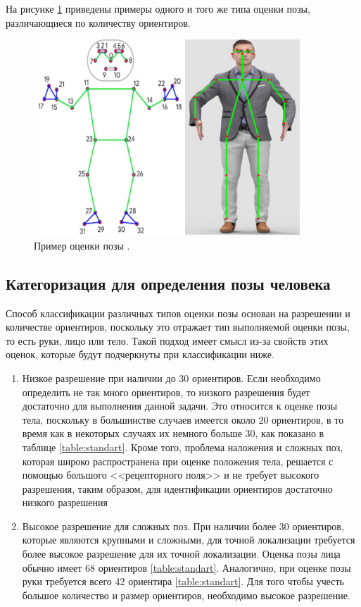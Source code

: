 На рисунке \ref{img:std} приведены примеры одного и того же типа оценки позы, различающиеся по количеству ориентиров.

\begin{figure}[ht!]
	\centering
	\includegraphics[width=0.6\linewidth]{assets/img-std.png}
	\caption{Пример оценки позы \cite{ImageRealtime}.}
	\label{img:std}
\end{figure}

\subsection{Категоризация для определения позы человека}

Способ классификации различных типов оценки позы основан на разрешении и количестве ориентиров, поскольку это отражает тип выполняемой оценки позы, то есть руки, лицо или тело.
Такой подход имеет смысл из-за свойств этих оценок, которые будут подчеркнуты при классификации ниже.

\begin{enumerate}[label=\arabic*)]

\item Низкое разрешение при наличии до 30 ориентиров. Если необходимо определить не так много ориентиров, то низкого разрешения будет достаточно для выполнения данной задачи. 
Это относится к оценке позы тела, поскольку в большинстве случаев имеется около 20 ориентиров, в то время как в некоторых случаях их немного больше 30, как показано в таблице \ref{table:standart}.
Кроме того, проблема наложения и сложных поз, которая широко распространена при оценке положения тела, решается с помощью большого <<рецепторного поля>> и не требует высокого разрешения, таким образом, для идентификации ориентиров достаточно низкого разрешения

\item Высокое разрешение для сложных поз.
При наличии более 30 ориентиров, которые являются крупными и сложными, для точной локализации требуется более высокое разрешение для их точной локализации.
Оценка позы лица обычно имеет 68 ориентиров \ref{table:standart}. Аналогично, при оценке позы руки требуется всего 42 ориентира \ref{table:standart}. Для того чтобы учесть большое количество и размер ориентиров, необходимо высокое разрешение.  

\end{enumerate}


